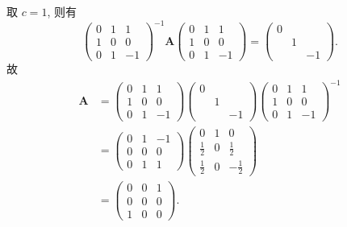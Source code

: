 \documentclass[../../main.tex]{subfiles}
\begin{document}
\begin{solution}
取 $c = 1$, 则有
$$
\begin{pmatrix} 0 & 1 & 1 \\ 1 & 0 & 0 \\ 0 & 1 & -1 \end{pmatrix}^{-1} \boldsymbol{A} \begin{pmatrix} 0 & 1 & 1 \\ 1 & 0 & 0 \\ 0 & 1 & -1 \end{pmatrix} = \begin{pmatrix} 0 & & \\ & 1 & \\ & & -1 \end{pmatrix}.
$$
故
$$
\begin{aligned}
\boldsymbol{A} &= \begin{pmatrix} 0 & 1 & 1 \\ 1 & 0 & 0 \\ 0 & 1 & -1 \end{pmatrix} \begin{pmatrix} 0 & & \\ & 1 & \\ & & -1 \end{pmatrix} \begin{pmatrix} 0 & 1 & 1 \\ 1 & 0 & 0 \\ 0 & 1 & -1 \end{pmatrix}^{-1} \\
&= \begin{pmatrix} 0 & 1 & -1 \\ 0 & 0 & 0 \\ 0 & 1 & 1 \end{pmatrix} \begin{pmatrix} 0 & 1 & 0 \\ \frac{1}{2} & 0 & \frac{1}{2} \\ \frac{1}{2} & 0 & -\frac{1}{2} \end{pmatrix} \\
&= \begin{pmatrix} 0 & 0 & 1 \\ 0 & 0 & 0 \\ 1 & 0 & 0 \end{pmatrix}.
\end{aligned}
$$
\end{solution}
\end{document}
